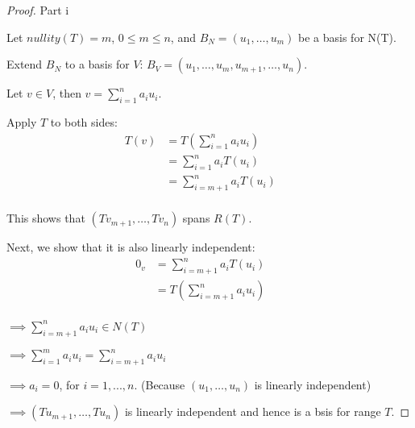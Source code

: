 \documentclass{article}
\begin{document}
\begin{proof}{Part i}
  $ $

  Let $nullity(T) = m$, $0 \leq m \leq n$,  and $B_N = (u_1,\ldots,u_m)$ be a basis for N(T).
  \newline

  Extend $B_N$ to a basis for $V$: $B_V=(u_1,\ldots,u_m,u_{m+1},\ldots,u_n)$.
  \newline

  Let $v \in V$, then $v = \sum_{i=1}^{n} a_i u_i$.

  Apply $T$ to both sides:
  \begin{align*}
    T(v) &= T(\sum_{i=1}^{n} a_i u_i) &&\\
    &= \sum_{i=1}^{n} a_i T(u_i) &&\\
    &= \sum_{i=m+1}^{n} a_i T(u_i) &&\\
  \end{align*}

  This shows that $(Tv_{m+1},\ldots, Tv_n)$ spans $R(T)$.

  Next, we show that it is also linearly independent:
  \begin{align*}
    0_v &= \sum_{i=m+1}^{n} a_i T(u_i) &&\\
    &= T(\sum_{i=m+1}^{n} a_i u_i) &&\\
  \end{align*}

  \noindent
  $\implies \sum_{i=m+1}^{n} a_i u_i \in N(T)$

  \noindent
  $\implies \sum_{i=1}^{m} a_i u_i = \sum_{i=m+1}^{n} a_i u_i$

  \noindent
  $\implies a_i = 0$, for $i=1,...,n$. \qquad (Because $(u_1,\ldots,u_n)$ is linearly independent)

  \noindent
  $\implies (Tu_{m+1},\ldots,Tu_n)$ is linearly independent and hence is a bsis for range $T$.

\end{proof}
\end{document}
